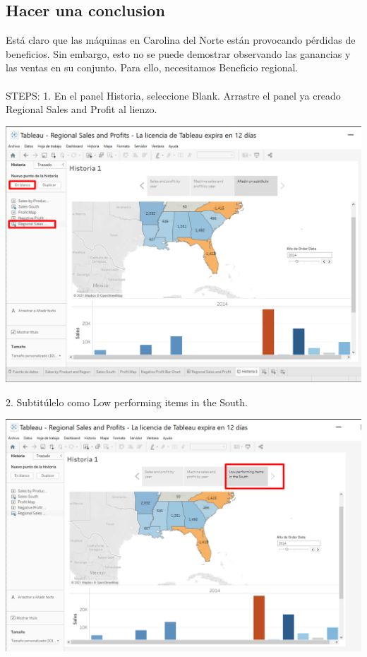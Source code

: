 \documentclass[12pt,letterpaper]{article}
\begin{document}
\subsection{Hacer una conclusion}
Está claro que las máquinas en Carolina del Norte están provocando pérdidas de
beneficios. Sin embargo, esto no se puede demostrar observando las ganancias y las
ventas en su conjunto. Para ello, necesitamos Beneficio regional.
\\\\STEPS:
1. En el panel Historia, seleccione Blank. Arrastre el panel ya creado Regional Sales and
Profit al lienzo.
\begin{center}
    \includegraphics[width=16cm]{img/65.png}  
\end{center}
2. Subtitúlelo como Low performing items in the South.
\begin{center}
    \includegraphics[width=16cm]{img/66.png}  
\end{center}
\end{document}
